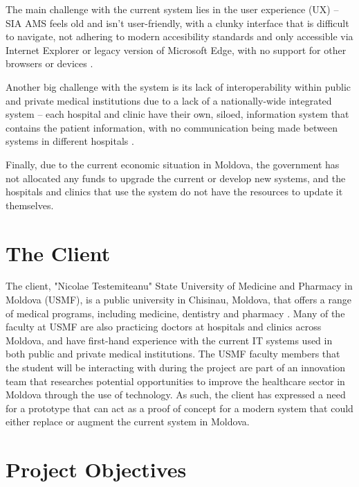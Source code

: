 The main challenge with the current system lies in the user experience (UX) -- SIA AMS feels old and isn't user-friendly, with a clunky interface that is difficult to navigate, not adhering to modern accesibility standards and only accessible via Internet Explorer or legacy version of Microsoft Edge, with no support for other browsers or devices \parencite{mdehr}. 

Another big challenge with the system is its lack of interoperability within public and private medical institutions due to a lack of a nationally-wide integrated system -- each hospital and clinic have their own, siloed, information system that contains the patient information, with no communication being made between systems in different hospitals \parencite{mdehr}. 

Finally, due to the current economic situation in Moldova, the government has not allocated any funds to upgrade the current or develop new systems, and the hospitals and clinics that use the system do not have the resources to update it themselves.

\section{The Client}

The client, "Nicolae Testemiteanu" State University of Medicine and Pharmacy in Moldova (USMF), is a public university in Chisinau, Moldova, that offers a range of medical programs, including medicine, dentistry and pharmacy \parencite{mduni}. Many of the faculty at USMF are also practicing doctors at hospitals and clinics across Moldova, and have first-hand experience with the current IT systems used in both public and private medical institutions. The USMF faculty members that the student will be interacting with during the project are part of an innovation team that researches potential opportunities to improve the healthcare sector in Moldova through the use of technology. As such, the client has expressed a need for a prototype that can act as a proof of concept for a modern system that could either replace or augment the current system in Moldova.

\section{Project Objectives}

